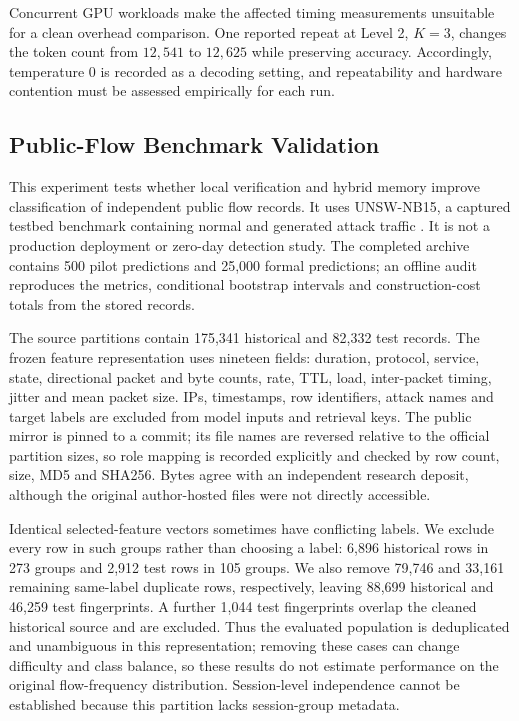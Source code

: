 Concurrent GPU workloads make the affected timing measurements unsuitable for a clean overhead comparison. One reported repeat at Level 2, $K=3$, changes the token count from $12{,}541$ to $12{,}625$ while preserving accuracy. Accordingly, temperature $0$ is recorded as a decoding setting, and repeatability and hardware contention must be assessed empirically for each run.


\subsection{Public-Flow Benchmark Validation}
\label{sec:exp6}
This experiment tests whether local verification and hybrid memory improve classification of independent public flow records. It uses UNSW-NB15, a captured testbed benchmark containing normal and generated attack traffic \cite{moustafa2015unsw}. It is not a production deployment or zero-day detection study. The completed archive contains 500 pilot predictions and 25,000 formal predictions; an offline audit reproduces the metrics, conditional bootstrap intervals and construction-cost totals from the stored records.

The source partitions contain 175,341 historical and 82,332 test records. The frozen feature representation uses nineteen fields: duration, protocol, service, state, directional packet and byte counts, rate, TTL, load, inter-packet timing, jitter and mean packet size. IPs, timestamps, row identifiers, attack names and target labels are excluded from model inputs and retrieval keys. The public mirror is pinned to a commit; its file names are reversed relative to the official partition sizes, so role mapping is recorded explicitly and checked by row count, size, MD5 and SHA256. Bytes agree with an independent research deposit, although the original author-hosted files were not directly accessible.

Identical selected-feature vectors sometimes have conflicting labels. We exclude every row in such groups rather than choosing a label: 6,896 historical rows in 273 groups and 2,912 test rows in 105 groups. We also remove 79,746 and 33,161 remaining same-label duplicate rows, respectively, leaving 88,699 historical and 46,259 test fingerprints. A further 1,044 test fingerprints overlap the cleaned historical source and are excluded. Thus the evaluated population is deduplicated and unambiguous in this representation; removing these cases can change difficulty and class balance, so these results do not estimate performance on the original flow-frequency distribution. Session-level independence cannot be established because this partition lacks session-group metadata.

